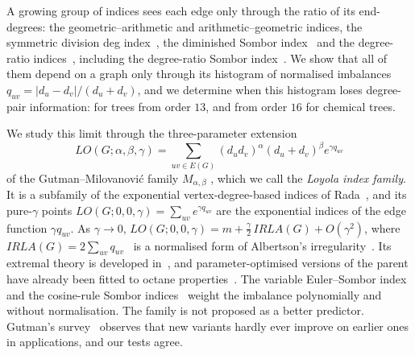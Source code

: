  A growing group of indices sees each edge only through the ratio of
  its end-degrees: the geometric--arithmetic and arithmetic--geometric
  indices, the symmetric division deg index~\cite{VukicevicGasperov2010},
  the diminished Sombor index~\cite{MovahediGutmanRedzepovicFurtula2026}
  and the degree-ratio
  indices~\cite{NyauliBuragohain2027DRSO, GutmanBuragohainNyauli2026},
  including the degree-ratio Sombor
  index~\cite{GutmanRedzepovicBuragohainNyauli2027, AliGutmanEtAl2027DRSO, ShaoJahanbani2027}.
  We show that all of them depend on a graph only through its histogram
  of normalised imbalances $q_{uv} = |d_u - d_v|/(d_u + d_v)$, and we
  determine when this histogram loses degree-pair information: for trees
  from order $13$, and from order $16$ for chemical trees.

  We study this limit through the three-parameter extension
  \[
  LO(G;\alpha,\beta,\gamma) = \sum_{uv \in E(G)}
  (d_u d_v)^{\alpha}(d_u+d_v)^{\beta} e^{\gamma q_{uv}}
  \]
  of the Gutman--Milovanovi\'c family $M_{\alpha,\beta}$
  \cite{GutmanMilovanovic2020AKCE, MolinaSigarreta2025GM}, which we call
  the \emph{Loyola index family}. It is a subfamily of the exponential
  vertex-degree-based indices of Rada~\cite{Rada2019ExpVDB}, and its
  pure-$\gamma$ points $LO(G;0,0,\gamma) = \sum_{uv} e^{\gamma q_{uv}}$
  are the exponential indices of the edge function $\gamma q_{uv}$. As
  $\gamma \to 0$, $LO(G;0,0,\gamma) = m + \tfrac{\gamma}{2}\,IRLA(G) + O(\gamma^2)$,
  where $IRLA(G) = 2\sum_{uv} q_{uv}$~\cite{RetiSharafdini2018IRLA} is a
  normalised form of Albertson's irregularity~\cite{Albertson1997, LinZhouWangMiao2022}. Its extremal theory is developed
  in~\cite{CruzMonsalveRada2020, Sigarreta2022ExpVDB, GaoAMC2024, HuMATCH2022},
  and parameter-optimised versions of the parent have already been fitted
  to octane properties~\cite{AliGutmanFurtulaAlbalahiHamza2025}. The
  variable Euler--Sombor index~\cite{GutmanRedzepovicKizilirmakKulli2025EU}
  and the cosine-rule Sombor indices~\cite{NyauliBuragohain2026CoRSO}
  weight the imbalance polynomially and without normalisation. The family
  is not proposed as a better predictor. Gutman's survey~\cite{Gutman2026SomborSurvey}
  observes that new variants hardly ever improve on earlier ones in
  applications, and our tests agree.

